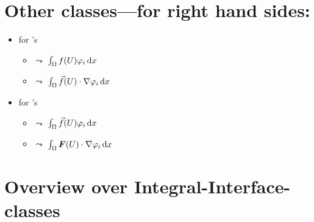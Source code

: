 \section{Other classes---for right hand sides:}
\begin{itemize}
\item for 's
  \begin{itemize}
  \item {} $\leadsto$ $\int_\Omega f(U)\varphi_i\,\mathrm{d}x$
  \item {} $\leadsto$ $\int_\Omega \vec f(U)\cdot \nabla \varphi_i\,\mathrm{d}x$
  \end{itemize}
\item for 's
  \begin{itemize}
  \item {} $\leadsto$ $\int_\Omega \vec f(U)\varphi_i\,\mathrm{d}x$
  \item {} $\leadsto$ $\int_\Omega \boldsymbol{F}(U)\cdot \nabla \varphi_i\,\mathrm{d}x$
  \end{itemize}
\end{itemize}


\section{Overview over Integral-Interface-classes}



